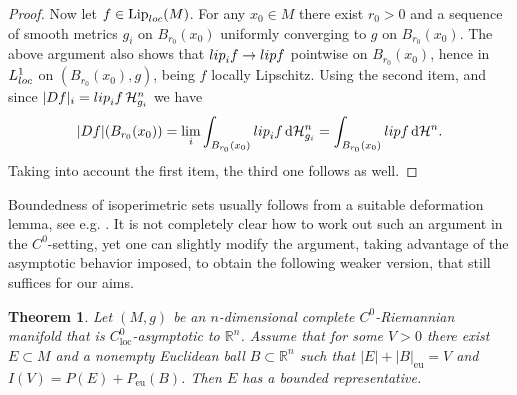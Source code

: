 \documentclass[a4paper,12pt,reqno]{amsart}
\numberwithin{equation}{section}
\theoremstyle{plain}
\newtheorem{theorem}{Theorem}[section]
\theoremstyle{definition}
\theoremstyle{remark}
\newcommand{\R}{\mathbb{R}}
\newcommand{\abs}[1]{\left\lvert#1\right\rvert}
\DeclareMathOperator{\Lip}{Lip}
\newcommand{\haus}{\mathcal{H}}
\newcommand{\de}{\ensuremath{\,\mathrm d}} %
\begin{document}
{\begin{proof}
Now let $f \in \Lip_{\rm loc}(M)$. For any $x_0 \in M$ there exist $r_0>0$ and a sequence of smooth metrics $g_i$ on $B_{r_0}(x_0)$ uniformly converging to $g$ on $B_{r_0}(x_0)$. The above argument also shows that ${\rm lip}_i f \to {\rm lip} f$ pointwise on $B_{r_0}(x_0)$, hence in $L^1_{\rm loc}$ on $(B_{r_0}(x_0), g)$, being $f$ locally Lipschitz. Using the second item, and since $|Df|_i={\rm lip}_i f \, \haus^n_{g_i}$ we have
\[
|D f|(B_{r_0}(x_0)) = \lim_i \int_{B_{r_0}(x_0)} {\rm lip}_i f \de \haus^n_{g_i} = \int_{B_{r_0}(x_0)} {\rm lip} f \de \haus^n.
\]
Taking into account the first item, the third one follows as well.
\end{proof}


Boundedness of isoperimetric sets usually follows from a suitable deformation lemma, see e.g. \cite[Theorem B.1]{AFP21}. It is not completely clear how to work out such an argument in the $C^0$-setting, yet one can slightly modify the argument, taking advantage of the asymptotic behavior imposed, to obtain the following weaker version, that still suffices for our aims.

\begin{theorem}\label{thm:BoundedIsoperimetricResidues}
  Let $(M, g)$ be an $n$-dimensional complete $C^0$-Riemannian manifold that is $C^0_{\mathrm{loc}}$-asymptotic to $\mathbb R^n$. Assume that for some $V > 0$ there exist $E\subset M$ and a nonempty Euclidean ball $B \subset \R^n$ such that $\abs{E} + \abs{B}_{\mathrm{eu}} = V$ and $I(V) = P(E) + P_{\mathrm{eu}}(B)$. Then $E$ has a bounded representative.
\end{theorem}

}
\end{document}
